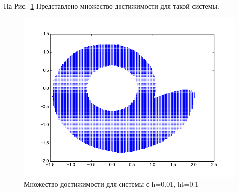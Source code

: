 На Рис.~\ref{fig:v1h0.02} Представлено множество достижимости для
такой системы.


\begin{figure}[h]
  \centering

  \includegraphics[width=0.5\linewidth]{img/figure_d_h_001_ht_01}
  \hfil \caption{Множество достижимости для системы с h=0.01, ht=0.1}
  \label{fig:v1h0.02}
\end{figure}


